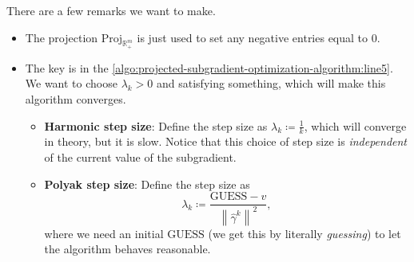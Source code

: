 \begin{remark}
	There are a few remarks we want to make.
	\begin{itemize}
		\item The projection \(\mathrm{Proj}_{\mathbb{R}^m_+}\) is just used to set any negative entries equal to \(0\).
		\item The key is in the \autoref{algo:projected-subgradient-optimization-algorithm:line5}. We want to choose \(\lambda_{k}>0\) and satisfying something, which will make this algorithm converges.
		      \begin{itemize}
			      \item \textbf{Harmonic step size}: Define the step size as \(\lambda_{k}\coloneqq \frac{1}{k}\), which will converge in theory, but it is slow. Notice that this choice of step size is \emph{independent} of the current value of the subgradient.
			      \item \textbf{Polyak step size}: Define the step size as
			            \[
				            \lambda_{k}\coloneqq \frac{\mathrm{GUESS} - v}{\left\lVert \hat{\gamma}^k\right\rVert^2 },
			            \]
			            where we need an initial \(\mathrm{GUESS}\) (we get this by literally \emph{guessing}) to let the algorithm behaves reasonable.
		      \end{itemize}
	\end{itemize}
\end{remark}